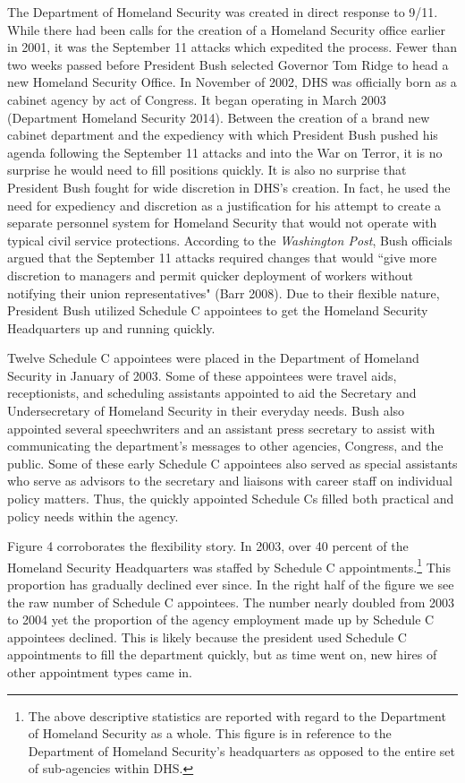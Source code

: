 \documentclass[12pt]{article}
\begin{document}
The Department of Homeland Security was created in direct response to 9/11. While there had been calls for the creation of a Homeland Security office earlier in 2001, it was the September 11 attacks which expedited the process. Fewer than two weeks passed before President Bush selected Governor Tom Ridge to head a new Homeland Security Office. In November of 2002, DHS was officially born as a cabinet agency by act of Congress. It began operating in March 2003 (Department Homeland Security 2014). Between the creation of a brand new cabinet department and the expediency with which President Bush pushed his agenda following the September 11 attacks and into the War on Terror, it is no surprise he would need to fill positions quickly. It is also no surprise that President Bush fought for wide discretion in DHS's creation. In fact, he used the need for expediency and discretion as a justification for his attempt to create a separate personnel system for Homeland Security that would not operate with typical civil service protections. According to the \textit{Washington Post}, Bush officials argued that the September 11 attacks required changes that would ``give more discretion to managers and permit quicker deployment of workers without notifying their union representatives" (Barr 2008). Due to their flexible nature, President Bush utilized Schedule C appointees to get the Homeland Security Headquarters up and running quickly.

Twelve Schedule C appointees were placed in the Department of Homeland Security in January of 2003. Some of these appointees were travel aids, receptionists, and scheduling assistants appointed to aid the Secretary and Undersecretary of Homeland Security in their everyday needs. Bush also appointed several speechwriters and an assistant press secretary to assist with communicating the department's messages to other agencies, Congress, and the public. Some of these early Schedule C appointees also served as special assistants who serve as advisors to the secretary and liaisons with career staff on individual policy matters. Thus, the quickly appointed Schedule Cs filled both practical and policy needs within the agency.

Figure 4 corroborates the flexibility story. In 2003, over 40 percent of the Homeland Security Headquarters was staffed by Schedule C appointments.\footnote{The above descriptive statistics are reported with regard to the Department of Homeland Security as a whole. This figure is in reference to the Department of Homeland Security's headquarters as opposed to the entire set of sub-agencies within DHS.} This proportion has gradually declined ever since. In the right half of the figure we see the raw number of Schedule C appointees. The number nearly doubled from 2003 to 2004 yet the proportion of the agency employment made up by Schedule C appointees declined. This is likely because the president used Schedule C appointments to fill the department quickly, but as time went on, new hires of other appointment types came in.
\end{document}
